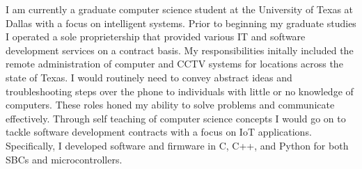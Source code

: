 \begin{cvletter}

	I am currently a graduate computer science student at the University
	of Texas at Dallas with a focus on intelligent systems.
	Prior to beginning my graduate studies I operated a
	sole proprietership that provided various IT and software development
	services on a contract basis. My responsibilities initally included
	the remote administration of computer and CCTV systems for locations
	across the state of Texas. I would routinely need to convey abstract
	ideas and troubleshooting steps over the phone to individuals with
	little or no knowledge of computers. These roles honed my ability to
	solve problems and communicate effectively.
	Through self teaching of computer science concepts I would go on
	to tackle software development contracts with a focus on IoT
	applications. Specifically, I developed software and firmware in C,
	C++, and Python for both SBCs and microcontrollers.

\end{cvletter}
